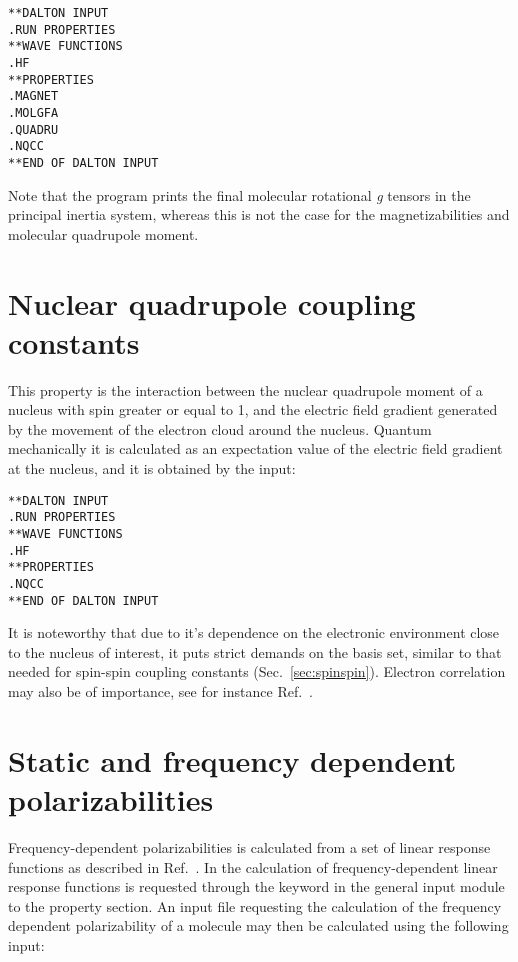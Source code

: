 \begin{verbatim}
**DALTON INPUT
.RUN PROPERTIES
**WAVE FUNCTIONS
.HF
**PROPERTIES
.MAGNET
.MOLGFA
.QUADRU
.NQCC
**END OF DALTON INPUT
\end{verbatim}

Note that the program prints the final molecular rotational {\em g}
tensors in the
principal inertia system, whereas this is not the case for the
magnetizabilities and molecular quadrupole moment.

\section{Nuclear quadrupole coupling constants}

This property is the interaction between the nuclear quadrupole moment
of a nucleus with spin greater or equal to 1, and the electric field gradient
generated by the movement of the electron cloud around the nucleus.
Quantum mechanically it is calculated as an expectation value of the electric
field gradient  at the nucleus, and it is obtained by the input:

\begin{verbatim}
**DALTON INPUT
.RUN PROPERTIES
**WAVE FUNCTIONS
.HF
**PROPERTIES
.NQCC
**END OF DALTON INPUT
\end{verbatim}

It is noteworthy that due to it's dependence on the
electronic environment close to the nucleus of interest, it puts strict
demands on the basis set, similar to that needed for spin-spin
coupling
constants (Sec.~\ref{sec:spinspin}). Electron correlation may also be of
importance, see for instance Ref.~\cite{mjssocpjthkrcpl243}.

\section{Static and frequency dependent
polarizabilities}\label{sec:polari}

Frequency-dependent polarizabilities is
calculated from a set of linear
response functions as
described in Ref.~\cite{jopjjcp82}. In {\aba} the
calculation of frequency-dependent linear response functions is
requested through the keyword  in the general input
module to the property section. An input file requesting the calculation of the frequency 
dependent polarizability of a molecule may then be calculated using
the following input:


